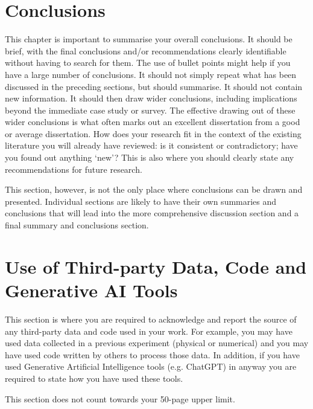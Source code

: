 \documentclass{article}
\begin{document}
\section{Conclusions}
\label{sec:conclusions}


This chapter is important to summarise your overall conclusions. It should be brief, with the final
conclusions and/or recommendations clearly identifiable without having to search for them. The use
of bullet points might help if you have a large number of conclusions. It should not simply repeat
what has been discussed in the preceding sections, but should summarise. It should not contain new information. It should then draw wider conclusions, including implications beyond the immediate case study or survey. The effective drawing out of these wider conclusions is what often marks out an excellent dissertation from a good or average dissertation. How does your research fit in the context of the existing literature you will already have reviewed: is it consistent or contradictory; have you found out anything `new'? This is also where you should clearly state any recommendations for future research.

This section, however, is not the only place where conclusions can be drawn and presented.  Individual sections are likely to have their own summaries and conclusions that will lead into the more comprehensive discussion section and a final summary and conclusions section.




\section{Use of Third-party Data, Code and Generative AI Tools}
\label{sec:DCG_Usaage}

This section is where you are required to acknowledge and report the source of any third-party data and code used in your work. For example, you may have used data collected in a previous experiment (physical or numerical) and you may have used code written by others to process those data. In addition, if you have used Generative Artificial Intelligence tools (e.g. ChatGPT) in anyway you are required to state how you have used these tools.

This section does not count towards your 50-page upper limit.
\end{document}
